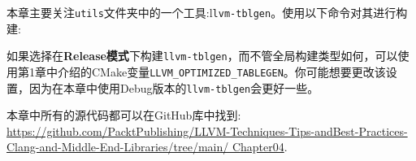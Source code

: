 本章主要关注\texttt{utils}文件夹中的一个工具:l\texttt{lvm-tblgen}。使用以下命令对其进行构建:


\begin{tcolorbox}[colback=blue!5!white,colframe=blue!75!black, fonttitle=\bfseries,title=Note]
\hspace*{0.7cm}如果选择在\textbf{Release模式}下构建\texttt{llvm-tblgen}，而不管全局构建类型如何，可以使用第1章中介绍的CMake变量\texttt{LLVM\_OPTIMIZED\_TABLEGEN}。你可能想要更改该设置，因为在本章中使用Debug版本的\texttt{llvm-tblgen}会更好一些。
\end{tcolorbox}

本章中所有的源代码都可以在GitHub库中找到: \url{https://github.com/PacktPublishing/LLVM-Techniques-Tips-andBest-Practices-Clang-and-Middle-End-Libraries/tree/main/
Chapter04}.
















